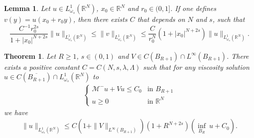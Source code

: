 \documentclass[10pt,a4paper]{amsart}
\newtheorem{theorem}{Theorem}
\newtheorem{lemma}{Lemma}
\newcommand{\Lomega}{L_{\omega_s}^1(\R^N)}
\newcommand{\M}{\mathcal{M}}
\newcommand{\R}{\mathbb{R}}
\begin{document}
\begin{lemma}
	\label{lemma:bounds}
	Let $u \in \Lomega$, $x_0 \in \R^N$ and $r_0 \in (0, 1]$. If one defines $v(y) = u(x_0 + r_0 y)$, then there exists $C$ that depends on $N$ and $s$, such that
	\[\frac{C^{-1}r_0^{2s}}{1+|x_0|^{N+2s}}\|u\|_{\Lomega} \leq \|v\|_{\Lomega} \leq  \frac{C}{r_0^{N}} (1+|x_0|^{N+2s}) \|u\|_{\Lomega}.\]
\end{lemma}

\begin{theorem}
\label{theo:harnack}
Let $R\geq 1$, $s\in (0,1)$ and $V\in C(B_{R+1})\cap L^{\infty}(B_{R+1})$.
There exists a positive constant $C = C(N, s, \lambda, \Lambda)$ such that for any viscosity solution $u\in C(\overline{B_{R+1}}) \cap \Lomega$ to
\begin{align*}
\begin{cases}
\M^-u + Vu \leq C_0 & \text{in }B_{R+1} \\
u\geq 0 & \text{in } \R^N
\end{cases}
\end{align*}
we have
\begin{align}
\label{eq:sharpharnack}
\|u\|_{\Lomega} \leq C(1+\|V\|_{L^{\infty}(B_{R+1})}) (1 + R^{N+2s})\left(\underset{B_R}{\inf}~u + C_0 \right).
\end{align}
\end{theorem}
\end{document}
